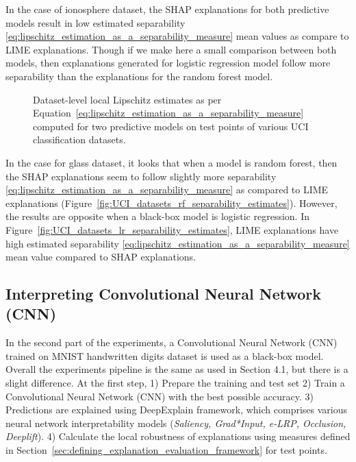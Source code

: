 \documentclass[english]{tktltiki2}
\theoremstyle{definition}
\theoremstyle{remark}
\begin{document}
In the case of ionosphere dataset, the SHAP explanations for both predictive models result in low estimated separability \eqref{eq:lipschitz_estimation_as_a_separability_measure} mean values as compare to LIME explanations. Though if we make here a small comparison between both models, then explanations generated for logistic regression model follow more separability than the explanations for the random forest model.

\begin{figure}[H]
	\hspace*{\fill}%
	\caption{Dataset-level local Lipschitz estimates as per Equation~\eqref{eq:lipschitz_estimation_as_a_separability_measure} computed for two predictive models on test points of various UCI classification datasets.}%
	\label{fig:UCI_datasets_separability_estimates}%
\end{figure}

In the case for glass dataset, it looks that when a model is random forest, then the SHAP explanations seem to follow slightly more separability \eqref{eq:lipschitz_estimation_as_a_separability_measure}  as compared to LIME explanations (Figure~\ref{fig:UCI_datasets_rf_separability_estimates}). However, the results are opposite when a black-box model is logistic regression. In Figure~\ref{fig:UCI_datasets_lr_separability_estimates}, LIME explanations have high estimated separability \eqref{eq:lipschitz_estimation_as_a_separability_measure}  mean value compared to SHAP explanations.

\subsection{Interpreting Convolutional Neural Network (CNN)}\label{sec:interpret_convolutional_neural_network}
In the second part of the experiments, a Convolutional Neural Network (CNN) trained on MNIST handwritten digits dataset is used as a black-box model. Overall the experiments pipeline is the same as used in Section 4.1, but there is a slight difference. At the first step, 1) Prepare the training and test set 2) Train a Convolutional Neural Network (CNN) with the best possible accuracy. 3) Predictions are explained using DeepExplain framework, which comprises various neural network interpretability models (\textit{Saliency, Grad*Input, e-LRP, Occlusion, Deeplift}). 4) Calculate the local robustness of explanations using measures defined in Section~\ref{sec:defining_explanation_evaluation_framework} for test points. 
\end{document}
